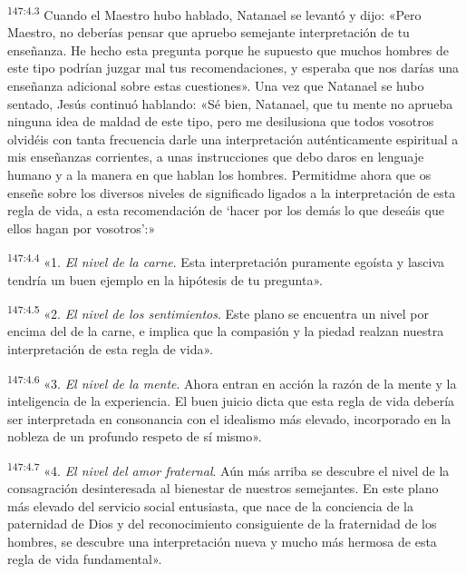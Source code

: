 \par
\textsuperscript{147:4.3} Cuando el Maestro hubo hablado, Natanael se levantó y dijo: «Pero Maestro, no deberías pensar que apruebo semejante interpretación de tu enseñanza. He hecho esta pregunta porque he supuesto que muchos hombres de este tipo podrían juzgar mal tus recomendaciones, y esperaba que nos darías una enseñanza adicional sobre estas cuestiones». Una vez que Natanael se hubo sentado, Jesús continuó hablando: «Sé bien, Natanael, que tu mente no aprueba ninguna idea de maldad de este tipo, pero me desilusiona que todos vosotros olvidéis con tanta frecuencia darle una interpretación auténticamente espiritual a mis enseñanzas corrientes, a unas instrucciones que debo daros en lenguaje humano y a la manera en que hablan los hombres. Permitidme ahora que os enseñe sobre los diversos niveles de significado ligados a la interpretación de esta regla de vida, a esta recomendación de `hacer por los demás lo que deseáis que ellos hagan por vosotros':»

\par
\textsuperscript{147:4.4} «1. \textit{El nivel de la carne}. Esta interpretación puramente egoísta y lasciva tendría un buen ejemplo en la hipótesis de tu pregunta».

\par
\textsuperscript{147:4.5} «2. \textit{El nivel de los sentimientos}. Este plano se encuentra un nivel por encima del de la carne, e implica que la compasión y la piedad realzan nuestra interpretación de esta regla de vida».

\par
\textsuperscript{147:4.6} «3. \textit{El nivel de la mente}. Ahora entran en acción la razón de la mente y la inteligencia de la experiencia. El buen juicio dicta que esta regla de vida debería ser interpretada en consonancia con el idealismo más elevado, incorporado en la nobleza de un profundo respeto de sí mismo».

\par
\textsuperscript{147:4.7} «4. \textit{El nivel del amor fraternal}. Aún más arriba se descubre el nivel de la consagración desinteresada al bienestar de nuestros semejantes. En este plano más elevado del servicio social entusiasta, que nace de la conciencia de la paternidad de Dios y del reconocimiento consiguiente de la fraternidad de los hombres, se descubre una interpretación nueva y mucho más hermosa de esta regla de vida fundamental».

